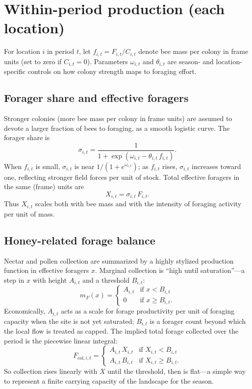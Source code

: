 \documentclass[11pt]{article}
\begin{document}
\section{Within-period production (each location)}

For location $i$ in period $t$, let $f_{i,t}=F_{i,t}/C_{i,t}$ denote bee mass per colony in frame units (set to zero if $C_{i,t}=0$). Parameters $\omega_{i,t}$ and $\theta_{i,t}$ are season- and location-specific controls on how colony strength maps to foraging effort.

\subsection{Forager share and effective foragers}

Stronger colonies (more bee mass per colony in frame units) are assumed to devote a larger fraction of bees to foraging, as a smooth logistic curve. The forager share is
\begin{equation}
\sigma_{i,t} = \frac{1}{1+\exp\!\left(\omega_{i,t}-\theta_{i,t}\, f_{i,t}\right)}.
\end{equation}
When $f_{i,t}$ is small, $\sigma_{i,t}$ is near $1/(1+e^{\omega_{i,t}})$; as $f_{i,t}$ rises, $\sigma_{i,t}$ increases toward one, reflecting stronger field forces per unit of stock. Total effective foragers in the same (frame) units are
\begin{equation}
X_{i,t} = \sigma_{i,t}\, F_{i,t}.
\end{equation}
Thus $X_{i,t}$ scales both with bee mass and with the intensity of foraging activity per unit of mass.

\subsection{Honey-related forage balance}

Nectar and pollen collection are summarized by a highly stylized production function in effective foragers $x$. Marginal collection is ``high until saturation''---a step in $x$ with height $A_{i,t}$ and a threshold $B_{i,t}$:
\begin{equation}
m_F(x) = \begin{cases}
A_{i,t} & \text{if } x < B_{i,t} \\
0 & \text{if } x \ge B_{i,t}.
\end{cases}
\end{equation}
Economically, $A_{i,t}$ acts as a scale for forage productivity per unit of foraging capacity when the site is not yet saturated; $B_{i,t}$ is a forager count beyond which the local flow is treated as capped. The implied total forage collected over the period is the piecewise linear integral:
\begin{equation}
F_{\mathrm{col},i,t} = \begin{cases}
A_{i,t}\, X_{i,t} & \text{if } X_{i,t} < B_{i,t} \\
A_{i,t}\, B_{i,t} & \text{if } X_{i,t} \ge B_{i,t}.
\end{cases}
\end{equation}
So collection rises linearly with $X$ until the threshold, then is flat---a simple way to represent a finite carrying capacity of the landscape for the season.
\end{document}
